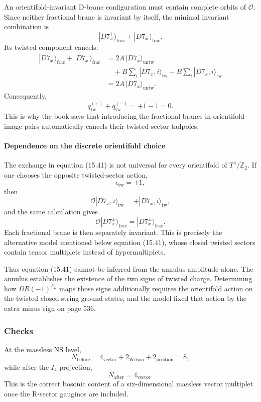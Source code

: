 \documentclass[
  10pt,
  a4paper,
  openany]{book}
\begin{document}
An orientifold-invariant D-brane configuration must contain complete
orbits of \(\mathcal O\). Since neither fractional brane is invariant by
itself, the minimal invariant combination is \[
|D7_x^+\rangle_{\mathrm{frac}}
+
|D7_x^-\rangle_{\mathrm{frac}}.
\] Its twisted component cancels: \[
\begin{aligned}
|D7_x^+\rangle_{\mathrm{frac}}
+
|D7_x^-\rangle_{\mathrm{frac}}
&=
2A\,|D7_x\rangle_{\mathrm{untw}}\\
&\quad
+
B\sum_i|D7_x,i\rangle_{\mathrm{tw}}
-
B\sum_i|D7_x,i\rangle_{\mathrm{tw}}\\
&=
2A\,|D7_x\rangle_{\mathrm{untw}}.
\end{aligned}
\] Consequently, \[
q_{\mathrm{tw}}^{(+)}
+
q_{\mathrm{tw}}^{(-)}
=
+1-1
=
0.
\] This is why the book says that introducing the fractional branes in
orientifold-image pairs automatically cancels their twisted-sector
tadpoles.

\paragraph{Dependence on the discrete orientifold
choice}\label{dependence-on-the-discrete-orientifold-choice}

The exchange in equation (15.41) is not universal for every orientifold
of \(T^4/\mathbb Z_2\). If one chooses the opposite twisted-sector
action, \[
\epsilon_{\mathrm{tw}}
=
+1,
\] then \[
\mathcal O
|D7_x,i\rangle_{\mathrm{tw}}
=
+|D7_x,i\rangle_{\mathrm{tw}},
\] and the same calculation gives \[
\mathcal O
|D7_x^\pm\rangle_{\mathrm{frac}}
=
|D7_x^\pm\rangle_{\mathrm{frac}}.
\] Each fractional brane is then separately invariant. This is precisely
the alternative model mentioned below equation (15.41), whose closed
twisted sectors contain tensor multiplets instead of hypermultiplets.

Thus equation (15.41) cannot be inferred from the annulus amplitude
alone. The annulus establishes the existence of the two signs of twisted
charge. Determining how \(\Omega R(-1)^{F_L}\) maps those signs
additionally requires the orientifold action on the twisted
closed-string ground states, and the model fixed that action by the
extra minus sign on page 536.

\subsubsection{Checks}\label{checks-22}

At the massless NS level, \[
N_{\mathrm{before}}
=
4_{\mathrm{vector}}
+
2_{\mathrm{Wilson}}
+
2_{\mathrm{position}}
=
8,
\] while after the \(I_4\) projection, \[
N_{\mathrm{after}}
=
4_{\mathrm{vector}}.
\] This is the correct bosonic content of a six-dimensional massless
vector multiplet once the R-sector gauginos are included.
\end{document}
